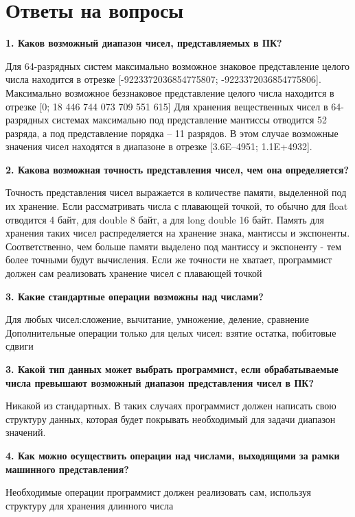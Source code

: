 \chapter{Ответы на вопросы}
\noindent\textbf{1. Каков возможный диапазон чисел, представляемых в ПК?}\par
Для 64-разрядных систем максимально возможное знаковое представление целого числа находится в отрезке [-9223372036854775807; -9223372036854775806]. Максимально возможное беззнаковое представление целого числа находится в отрезке [0; 18 446 744 073 709 551 615]
Для хранения вещественных чисел в 64-разрядных системах максимально под представление мантиссы отводится 52 разряда, а под представление порядка – 11 разрядов. В этом случае возможные значения чисел находятся в диапазоне в отрезке [3.6E–4951; 1.1E+4932].\newline

\noindent\textbf{2. Какова возможная точность представления чисел, чем она определяется?}\par
Точность представления чисел выражается в количестве памяти, выделенной под их хранение. Если рассматривать числа с плавающей точкой, то обычно для float отводится 4 байт, для double 8 байт, а для long double 16 байт. Память для хранения таких чисел распределяется на хранение знака, мантиссы и экспоненты. Соответственно, чем больше памяти выделено под мантиссу и экспоненту - тем более точными будут вычисления. Если же точности не хватает, программист должен сам реализовать хранение чисел с плавающей точкой\newline

\noindent\textbf{3. Какие стандартные операции возможны над числами?}\par
Для любых чисел:сложение, вычитание, умножение, деление, сравнение
Дополнительные операции только для целых чисел: взятие остатка, побитовые сдвиги

\noindent\textbf{3. Какой тип данных может выбрать программист, если обрабатываемые
	числа превышают возможный диапазон представления чисел в ПК?}\par
Никакой из стандартных. В таких случаях программист должен написать свою структуру данных, которая будет покрывать необходимый для задачи диапазон значений.

\noindent\textbf{4. Как можно осуществить операции над числами, выходящими за
	рамки машинного представления?}\par
Необходимые операции программист должен реализовать сам, используя структуру для хранения длинного числа
